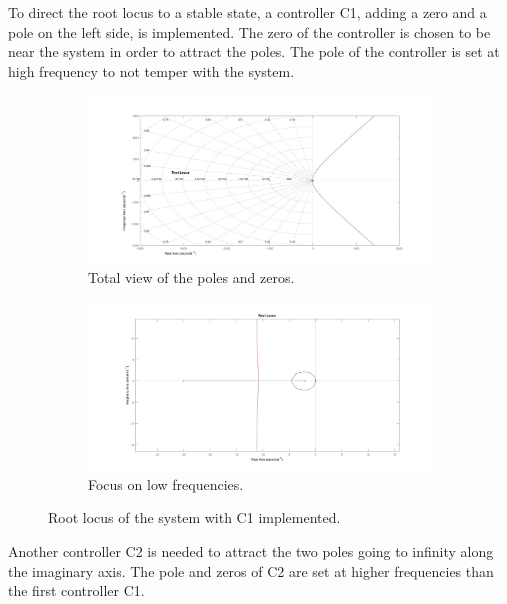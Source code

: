 To direct the root locus to a stable state, a controller C1, adding a zero and a pole on the left side, is implemented. The zero of the controller is chosen to be near the system in order to attract the poles. The pole of the controller is set at high frequency to not temper with the system. 

\begin{figure}[htbp]
	\centering
	\begin{subfigure}{0.45\textwidth}
		\includegraphics[width=\textwidth]{figures/Rocket/design/tf_with_controller_1C_1}
		\caption{Total view of the poles and zeros.}
		\label{fig:SystemC1}
	\end{subfigure}
	\begin{subfigure}{0.45\textwidth}
		\centering
		\includegraphics[width=\textwidth]{figures/Rocket/design/tf_with_C1_zoom}
		\caption{Focus on low frequencies.}
		\label{fig:SystemC1zoom}
	\end{subfigure}
	\caption{Root locus of the system with C1 implemented.}
\end{figure}

Another controller C2 is needed to attract the two poles going to infinity along the imaginary axis. The pole and zeros of C2 are set at higher frequencies than the first controller C1. 

